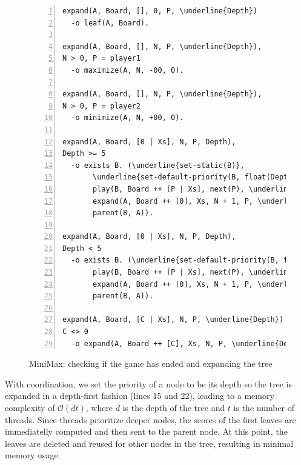 \begin{figure}[h!]
\scriptsize\begin{Verbatim}[numbers=left,commandchars=\\\{\}]
expand(A, Board, [], 0, P, \underline{Depth})
  -o leaf(A, Board).

expand(A, Board, [], N, P, \underline{Depth}),
N > 0, P = player1
  -o maximize(A, N, -00, 0).

expand(A, Board, [], N, P, \underline{Depth}),
N > 0, P = player2
  -o minimize(A, N, +00, 0).

expand(A, Board, [0 | Xs], N, P, Depth),
Depth >= 5
  -o exists B. (\underline{set-static(B)},
       \underline{set-default-priority(B, float(Depth + 1))},
       play(B, Board ++ [P | Xs], next(P), \underline{Depth + 1}),
       expand(A, Board ++ [0], Xs, N + 1, P, \underline{Depth}),
       parent(B, A)).

expand(A, Board, [0 | Xs], N, P, Depth),
Depth < 5
  -o exists B. (\underline{set-default-priority(B, float(Depth + 1))},
       play(B, Board ++ [P | Xs], next(P), \underline{Depth + 1}),
       expand(A, Board ++ [0], Xs, N + 1, P, \underline{Depth}),
       parent(B, A)).

expand(A, Board, [C | Xs], N, P, \underline{Depth})
C <> 0
  -o expand(A, Board ++ [C], Xs, N, P, \underline{Depth}).
\end{Verbatim}
\caption{MiniMax: checking if the game has ended and expanding the tree}
\label{minimax:check-end}
\end{figure}
\normalsize

With coordination, we set the priority of a node to be its depth
so the tree is expanded in a depth-first fashion (lines 15 and 22),
leading to a memory complexity of $\mathcal{O}(d t)$, where $d$
is the depth of the tree and $t$ is the number of threads.
Since threads prioritize deeper nodes, the scores of the first leaves are immediatelly
computed and then sent to the parent node. At this point, the leaves are deleted
and reused for other nodes in the tree, resulting in minimal memory usage.

